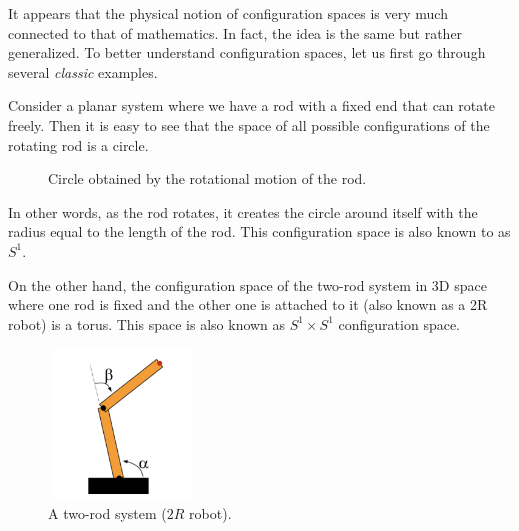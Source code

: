\documentclass[12pt]{article}
\theoremstyle{definition}
\begin{document}
\bigskip

It appears that the physical notion of configuration spaces is very much connected to that of mathematics.
In fact, the idea is the same but rather generalized. To better understand configuration spaces, let us
first go through several \textit{classic} examples.

\bigskip

\cite{1} Consider a planar system where we have a rod with a fixed end that can rotate freely. Then it is
easy to see that the space of all possible configurations of the rotating rod is a circle.

\begin{figure}[H]
\centering
{}
\caption*{Circle obtained by the rotational motion of the rod.}
\end{figure}

In other words, as the rod rotates, it creates the circle around itself
with the radius equal to the length of the rod. This configuration space
is also known to as $S^1$.

\bigskip

\cite{2} On the other hand, the configuration space of the two-rod
system in 3D space where one rod is fixed and the other one is attached to it (also known as a 2R robot)
is a torus. This space is also known as $S^1 \times S^1$ configuration space.

\begin{figure}[H]
\centering
\includegraphics[width=4cm, height=4cm]{two-rod-system}
\caption*{A two-rod system ($2R$ robot).}
\end{figure}
\end{document}

